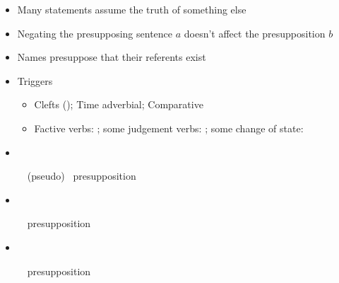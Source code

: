 \documentclass[headrule,footrule]{foils}
\begin{document}
\begin{itemize}
\item Many statements assume the truth of something else
  \begin{exe}
    \ex   \begin{xlist}
    \ex {} %
    \ex {} %
    \end{xlist}
  \end{exe}
\item Negating the presupposing sentence $a$ doesn't affect the presupposition $b$
\item Names presuppose that their referents exist
\item Triggers 
  \begin{itemize}
  \item Clefts (); Time adverbial; Comparative
  \item Factive verbs: ; 
    some judgement verbs: ; 
    some change of state: 
    \end{itemize}
\end{itemize}

\begin{itemize}
\item  
\begin{exe}
\ex  
\ex   (pseudo)
\ex   \hfill presupposition
\end{exe}
\item  
\begin{exe}
\ex  
\ex   \hfill presupposition
\end{exe}
\item  
\begin{exe}
\ex  
\ex   \hfill presupposition
\end{exe}
\end{itemize}
\end{document}
